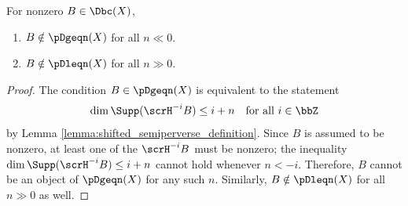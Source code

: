 \begin{lemma} \label{lemma:nonzero_objects_do_not_belong_to_shifted_perverse_t_structure_subcategories_for_sufficiently_large_indices}
    \TODO{}
    For nonzero $B \in \Dbc(X)$, 
    \begin{enumerate}
        \item $B \notin \pDgeqn(X)$ for all $n \ll 0$.
        \item $B \notin \pDleqn(X)$ for all $n \gg 0$. 
    \end{enumerate}
\end{lemma}
\begin{proof}
    The condition $B \in \pDgeqn(X)$ is equivalent to the statement 
    $$\dim \Supp(\scrH^{-i} B) \leq i+n \quad \text{for all } i \in \bbZ$$
    by Lemma \ref{lemma:shifted_semiperverse_definition}. %
    Since $B$ is assumed to be nonzero, at least one of the $\scrH^{-i} B$ must be nonzero; the inequality $\dim \Supp(\scrH^{-i} B) \leq i+n$ cannot hold whenever $n < -i$. Therefore, $B$ cannot be an object of $\pDgeqn(X)$ for any such $n$. Similarly, $B \notin \pDleqn(X)$ for all $n \gg 0$ as well.
\end{proof}